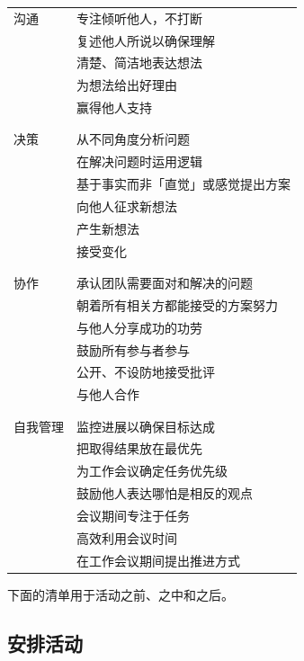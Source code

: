 \noindent
\begin{longtable}{p{}p{}}

  沟通
  & 专注倾听他人，不打断 \\
  & 复述他人所说以确保理解 \\
  & 清楚、简洁地表达想法 \\
  & 为想法给出好理由 \\
  & 赢得他人支持 \\
  \\ [-1.5ex] \hline \\ [-1.5ex]

  决策
  & 从不同角度分析问题 \\
  & 在解决问题时运用逻辑 \\
  & 基于事实而非「直觉」或感觉提出方案 \\
  & 向他人征求新想法 \\
  & 产生新想法 \\
  & 接受变化 \\
  \\ [-1.5ex] \hline \\ [-1.5ex]

  协作
  & 承认团队需要面对和解决的问题 \\
  & 朝着所有相关方都能接受的方案努力 \\
  & 与他人分享成功的功劳 \\
  & 鼓励所有参与者参与 \\
  & 公开、不设防地接受批评 \\
  & 与他人合作 \\
  \\ [-1.5ex] \hline \\ [-1.5ex]

  自我管理
  & 监控进展以确保目标达成 \\
  & 把取得结果放在最优先 \\
  & 为工作会议确定任务优先级 \\
  & 鼓励他人表达哪怕是相反的观点 \\
  & 会议期间专注于任务 \\
  & 高效利用会议时间 \\
  & 在工作会议期间提出推进方式 \\

\end{longtable}


下面的清单用于活动之前、之中和之后。

\subsection*{安排活动}

